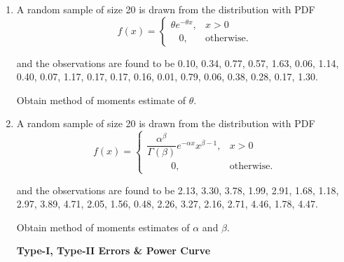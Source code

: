 \documentclass[11pt, a4paper]{article}
\begin{document}
\begin{enumerate}
	
	
	
\vspace{10pt}	
	
	
	\item A random sample of size 20 is drawn from the distribution with PDF
	\begin{equation*}
	 f(x) =
		\begin{cases}
		 \theta e^{-\theta x}, & x > 0  \\
		 \hspace{10pt} 0, & \text{otherwise}.
		\end{cases}
	\end{equation*}
	
and the observations are found to be 0.10, 0.34, 0.77, 0.57, 1.63, 0.06, 1.14, 0.40, 0.07, 1.17, 0.17, 0.17, 0.16, 0.01, 0.79, 0.06, 0.38, 0.28, 0.17, 1.30.

Obtain method of moments estimate of $\theta$.
	
	
\vspace{10pt}	
	
	
	\item A random sample of size 20 is drawn from the distribution with PDF
	\begin{equation*}
	 f(x) =
		\begin{cases}
		 \dfrac{\alpha^{\beta}}{\Gamma(\beta)} e^{-\alpha x}x^{\beta - 1}, & x > 0  \\
		 \hspace{30pt} 0, & \text{otherwise}.
		\end{cases}
	\end{equation*}
	
and the observations are found to be 2.13, 3.30, 3.78, 1.99, 2.91, 1.68, 1.18, 2.97, 3.89, 4.71, 2.05, 1.56, 0.48, 2.26, 3.27, 2.16, 2.71, 4.46, 1.78, 4.47.

Obtain method of moments estimates of $\alpha$ and $\beta$.










\newpage


\begin{center}

\textbf{\huge Type-I, Type-II Errors \& Power Curve}

\end{center}


\vspace{50pt}




\end{enumerate}
\end{document}
